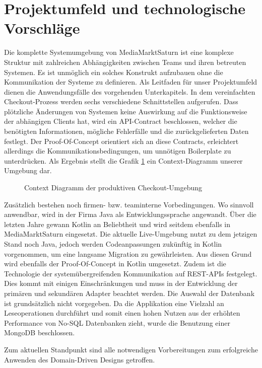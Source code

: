 \section{Projektumfeld und technologische Vorschläge}

Die komplette Systemumgebung von MediaMarktSaturn ist eine komplexe Struktur mit zahlreichen Abhängigkeiten zwischen Teams und ihren betreuten Systemen. Es ist unmöglich ein solches Konstrukt aufzubauen ohne die Kommunikation der Systeme zu definieren. Als Leitfaden für unser Projektumfeld dienen die Anwendungsfälle des vorgehenden Unterkapitels. In dem vereinfachten Checkout-Prozess werden sechs verschiedene Schnittstellen aufgerufen. Dass plötzliche Änderungen von Systemen keine Auswirkung auf die Funktionsweise der abhängigen Clients hat, wird ein API-Contract beschlossen, welcher die benötigten Informationen, mögliche Fehlerfälle und die zurückgelieferten Daten festlegt. Der Proof-Of-Concept orientiert sich an diese Contracts, erleichtert allerdings die Kommunikationsbedingungen, um unnötigen Boilerplate zu unterdrücken. Als Ergebnis stellt die Grafik \ref{fig:ContextDiagramm} ein Context-Diagramm unserer Umgebung dar.


\begin{figure}[htbp]
	\centering
	
	\caption{Context Diagramm der produktiven Checkout-Umgebung}
	\label{fig:ContextDiagramm}
\end{figure}

Zusätzlich bestehen noch firmen- bzw. teaminterne Vorbedingungen. Wo sinnvoll anwendbar, wird in der Firma Java als Entwicklungssprache angewandt. Über die letzten Jahre gewann Kotlin an Beliebtheit und wird seitdem ebenfalls in MediaMarktSaturn eingesetzt. Die aktuelle Live-Umgebung nutzt zu dem jetzigen Stand noch Java, jedoch werden Codeanpassungen zukünftig in Kotlin vorgenommen, um eine langsame Migration zu gewährleisten. Aus diesen Grund wird ebenfalls der Proof-Of-Concept in Kotlin umgesetzt. Zudem ist die Technologie der systemübergreifenden Kommunikation auf REST-APIs festgelegt. Dies kommt mit einigen Einschränkungen und muss in der Entwicklung der primären und sekundären Adapter beachtet werden. Die Auswahl der Datenbank ist grundsätzlich nicht vorgegeben. Da die Applikation eine Vielzahl an Leseoperationen durchführt und somit einen hohen Nutzen aus der erhöhten Performance von No-SQL Datenbanken zieht, wurde die Benutzung einer MongoDB beschlossen.

Zum aktuellen Standpunkt sind alle notwendigen Vorbereitungen zum erfolgreiche Anwenden des Domain-Driven Designs getroffen.  

